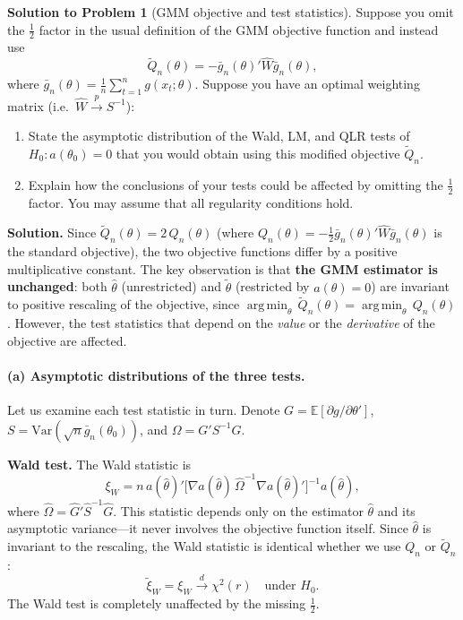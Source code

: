 \documentclass[12pt]{article}
\newcommand{\E}{\mathbb E}
\newcommand{\Var}{\mathrm{Var}}
\DeclareMathOperator*{\argmin}{arg\,min}
\theoremstyle{definition}
\newtheorem{solution}{Solution to Problem}
\begin{document}
\newpage
\begin{solution}[GMM objective and test statistics]
Suppose you omit the $\frac{1}{2}$ factor in the usual definition of the GMM objective function and instead use
\[
\tilde{Q}_n(\theta) = -\bar{g}_n(\theta)'\hat{W}\bar{g}_n(\theta),
\]
where $\bar{g}_n(\theta) = \frac{1}{n}\sum_{t=1}^n g(x_t;\theta)$. Suppose you have an optimal weighting matrix (i.e.\ $\hat{W}\xrightarrow{p} S^{-1}$):
\begin{enumerate}
    \item State the asymptotic distribution of the Wald, LM, and QLR tests of $H_0\colon a(\theta_0)=0$ that you would obtain using this modified objective $\tilde{Q}_n$.
    \item Explain how the conclusions of your tests could be affected by omitting the $\frac{1}{2}$ factor. You may assume that all regularity conditions hold.
\end{enumerate}

\medskip
\noindent\textbf{Solution.} Since $\tilde{Q}_n(\theta) = 2\,Q_n(\theta)$ (where $Q_n(\theta)=-\frac{1}{2}\bar{g}_n(\theta)'\hat{W}\bar{g}_n(\theta)$ is the standard objective), the two objective functions differ by a positive multiplicative constant. The key observation is that \textbf{the GMM estimator is unchanged}: both $\hat{\theta}$ (unrestricted) and $\tilde{\theta}$ (restricted by $a(\theta)=0$) are invariant to positive rescaling of the objective, since $\argmin_\theta\,\tilde{Q}_n(\theta)=\argmin_\theta\,Q_n(\theta)$. However, the test statistics that depend on the \emph{value} or the \emph{derivative} of the objective are affected.

\bigskip
\paragraph{(a) Asymptotic distributions of the three tests.} Let us examine each test statistic in turn. Denote $G=\E[\partial g/\partial\theta']$, $S=\Var(\sqrt{n}\bar{g}_n(\theta_0))$, and $\Omega=G'S^{-1}G$.

\medskip
\noindent\textbf{Wald test.} The Wald statistic is
\[
\xi_W = n\,a(\hat\theta)'\bigl[\nabla a(\hat\theta)\,\hat\Omega^{-1}\nabla a(\hat\theta)'\bigr]^{-1}a(\hat\theta),
\]
where $\hat\Omega=\hat G'\hat S^{-1}\hat G$. This statistic depends only on the estimator $\hat\theta$ and its asymptotic variance---it never involves the objective function itself. Since $\hat\theta$ is invariant to the rescaling, the Wald statistic is identical whether we use $Q_n$ or $\tilde Q_n$:
\[
\boxed{\tilde\xi_W = \xi_W \xrightarrow{d} \chi^2(r) \quad\text{under }H_0.}
\]
The Wald test is completely unaffected by the missing $\frac{1}{2}$.


\end{solution}
\end{document}
